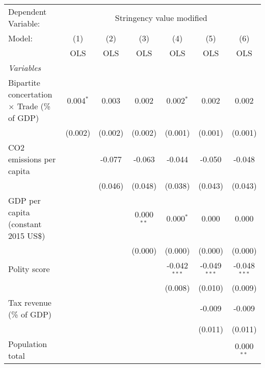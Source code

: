 
\begingroup
\centering
\begin{tabular}{lcccccc}
   \toprule
   Dependent Variable: & \multicolumn{6}{c}{Stringency value modified}\\
   Model:                                              & (1)         & (2)     & (3)          & (4)            & (5)            & (6)\\  
                                                       &  OLS        & OLS     & OLS          & OLS            & OLS            & OLS\\  
   \midrule
   \emph{Variables}\\
   Bipartite concertation $\times$ Trade (\% of GDP)   & 0.004$^{*}$ & 0.003   & 0.002        & 0.002$^{*}$    & 0.002          & 0.002\\   
                                                       & (0.002)     & (0.002) & (0.002)      & (0.001)        & (0.001)        & (0.001)\\   
   CO2 emissions per capita                            &             & -0.077  & -0.063       & -0.044         & -0.050         & -0.048\\   
                                                       &             & (0.046) & (0.048)      & (0.038)        & (0.043)        & (0.043)\\   
   GDP per capita (constant 2015 US\$)                 &             &         & 0.000$^{**}$ & 0.000$^{*}$    & 0.000          & 0.000\\   
                                                       &             &         & (0.000)      & (0.000)        & (0.000)        & (0.000)\\   
   Polity score                                        &             &         &              & -0.042$^{***}$ & -0.049$^{***}$ & -0.048$^{***}$\\   
                                                       &             &         &              & (0.008)        & (0.010)        & (0.009)\\   
   Tax revenue (\% of GDP)                             &             &         &              &                & -0.009         & -0.009\\   
                                                       &             &         &              &                & (0.011)        & (0.011)\\   
   Population total                                    &             &         &              &                &                & 0.000$^{**}$\\   

\end{tabular}
